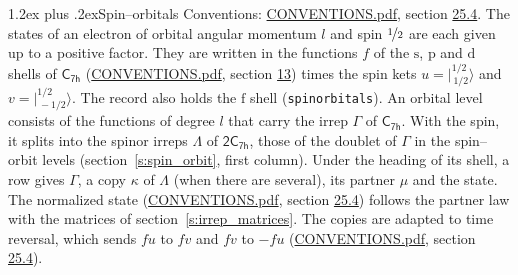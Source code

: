 \documentclass[10pt,a4paper]{article}
\makeatletter
\renewcommand\section{\@startsection{section}{1}{\z@}{-3ex plus -1ex minus -.2ex}%
  {1.2ex plus .2ex}{\normalfont\large\sffamily\bfseries\color{parttitle}}}
\numberwithin{equation}{section}
\newcommand{\grp}[1]{\mathsf{#1}}
\newcommand{\orbital}[1]{\mathrm{#1}}
\newcommand{\mult}{\kappa}
\newcommand{\intx}{\mu}
\newcommand{\jm}[2]{\bigl\lvert{}^{#1}_{\,#2}\bigr\rangle}
\makeatother
\begin{document}
\section{Spin--orbitals}\label{s:spin_orbitals}
Conventions: \href{../../CONVENTIONS.pdf}{CONVENTIONS.pdf}, section \href{../../CONVENTIONS.pdf\#conv.25.4}{25.4}.
\leavevmode\label{n:index.orbital.l}The states of an electron of orbital angular momentum $l$ and spin $\nicefrac{1}{2}$ are each given up to a positive factor. \label{n:local.spinor.uv}\label{n:local.function.f}They are written in the functions $f$ of the $\orbital{s}$, $\orbital{p}$ and $\orbital{d}$ shells of \href{../../../rotation/data/pdf/C7h.pdf}{$\grp{C_{7h}}$} (\href{../../CONVENTIONS.pdf}{CONVENTIONS.pdf}, section \href{../../../rotation/CONVENTIONS.pdf\#conv.13}{13}) times the spin kets $u = \jm{1/2}{1/2}$ and $v = \jm{1/2}{-1/2}$. The record also holds the $\orbital{f}$ shell (\texttt{spinorbitals}). An orbital level consists of the functions of degree $l$ that carry the irrep $\Gamma$ of \href{../../../rotation/data/pdf/C7h.pdf}{$\grp{C_{7h}}$}. With the spin, it splits into the spinor irreps $\Lambda$ of $\grp{2C_{7h}}$, those of the doublet of $\Gamma$ in the spin--orbit levels (section~\ref{s:spin_orbit}, first column). \label{n:head.state}Under the heading of its shell, a row gives $\Gamma$, a copy $\mult$ of $\Lambda$ (when there are several), its partner $\intx$ and the state. The normalized state (\href{../../CONVENTIONS.pdf}{CONVENTIONS.pdf}, section \href{../../CONVENTIONS.pdf\#conv.25.4}{25.4}) follows the partner law with the matrices of section~\ref{s:irrep_matrices}. The copies are adapted to time reversal, which sends $f u$ to $f v$ and $f v$ to $-f u$ (\href{../../CONVENTIONS.pdf}{CONVENTIONS.pdf}, section \href{../../CONVENTIONS.pdf\#conv.25.4}{25.4}).
\end{document}
